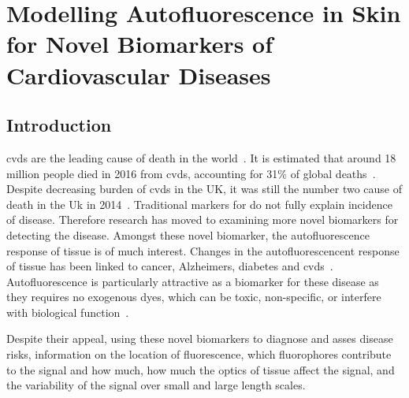 \chapter{Modelling Autofluorescence in Skin for Novel Biomarkers of Cardiovascular Diseases}
\label{chap:salvo}
\section{Introduction}


\Gls*{cvds} are the leading cause of death in the world~\cite{whodeath}.
It is estimated that around 18 million people died in 2016 from \gls*{cvds}, accounting for 31\% of global deaths~\cite{whodeath}.
Despite decreasing burden of \gls*{cvds} in the UK, it was still the number two cause of death in the Uk in 2014~\cite{bhatnagar2016trends}.
Traditional markers for do not fully explain incidence of disease.
Therefore research has moved to examining more novel biomarkers for detecting the disease.
Amongst these novel biomarker, the autofluorescence response of tissue is of much interest.
Changes in the autofluorescencent response of tissue has been linked to cancer, Alzheimers, diabetes and \gls*{cvds}~\cite{drakaki2009laser}.
Autofluorescence is particularly attractive as a biomarker for these disease as they requires no exogenous dyes, which can be toxic, non-specific, or interfere with biological function~\cite{kollias1998endogenous}.


Despite their appeal, using these novel biomarkers to diagnose and asses disease risks, information on the location of fluorescence, which fluorophores contribute to the signal and how much, how much the optics of tissue affect the signal, and the variability of the signal over small and large length scales.








